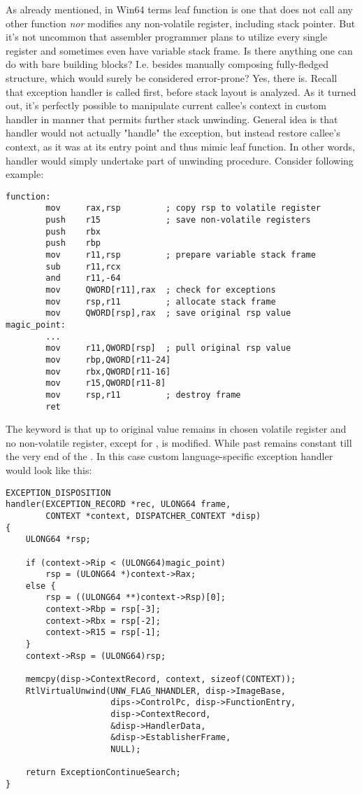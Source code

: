As already mentioned, in Win64 terms leaf function is one that does not
call any other function \emph{nor} modifies any non-volatile register,
including stack pointer. But it's not uncommon that assembler
programmer plans to utilize every single register and sometimes even
have variable stack frame. Is there anything one can do with bare
building blocks? I.e. besides manually composing fully-fledged
 structure, which would surely be considered
error-prone? Yes, there is. Recall that exception handler is called
first, before stack layout is analyzed. As it turned out, it's
perfectly possible to manipulate current callee's context in custom
handler in manner that permits further stack unwinding. General idea is
that handler would not actually "handle" the exception, but instead
restore callee's context, as it was at its entry point and thus mimic
leaf function. In other words, handler would simply undertake part of
unwinding procedure. Consider following example:

\begin{lstlisting}
function:
        mov     rax,rsp         ; copy rsp to volatile register
        push    r15             ; save non-volatile registers
        push    rbx
        push    rbp
        mov     r11,rsp         ; prepare variable stack frame
        sub     r11,rcx
        and     r11,-64
        mov     QWORD[r11],rax  ; check for exceptions
        mov     rsp,r11         ; allocate stack frame
        mov     QWORD[rsp],rax  ; save original rsp value
magic_point:
        ...
        mov     r11,QWORD[rsp]  ; pull original rsp value
        mov     rbp,QWORD[r11-24]
        mov     rbx,QWORD[r11-16]
        mov     r15,QWORD[r11-8]
        mov     rsp,r11         ; destroy frame
        ret
\end{lstlisting}

The keyword is that up to  original  value
remains in chosen volatile register and no non-volatile register,
except for , is modified. While past 
 remains constant till the very end of the .
In this case custom language-specific exception handler would look like this:

\begin{lstlisting}
EXCEPTION_DISPOSITION
handler(EXCEPTION_RECORD *rec, ULONG64 frame,
        CONTEXT *context, DISPATCHER_CONTEXT *disp)
{
    ULONG64 *rsp;

    if (context->Rip < (ULONG64)magic_point)
        rsp = (ULONG64 *)context->Rax;
    else {
        rsp = ((ULONG64 **)context->Rsp)[0];
        context->Rbp = rsp[-3];
        context->Rbx = rsp[-2];
        context->R15 = rsp[-1];
    }
    context->Rsp = (ULONG64)rsp;

    memcpy(disp->ContextRecord, context, sizeof(CONTEXT));
    RtlVirtualUnwind(UNW_FLAG_NHANDLER, disp->ImageBase,
                     dips->ControlPc, disp->FunctionEntry,
                     disp->ContextRecord,
                     &disp->HandlerData,
                     &disp->EstablisherFrame,
                     NULL);

    return ExceptionContinueSearch;
}
\end{lstlisting}

